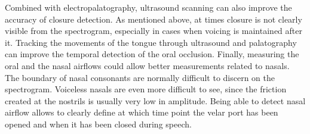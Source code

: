 \documentclass[11pt,a4paper,openany]{memoir}\usepackage[]{graphicx}\usepackage[]{color}
\begin{document}
Combined with electropalatography, ultrasound scanning can also improve the accuracy of closure detection.
As mentioned above, at times closure is not clearly visible from the spectrogram, especially in cases when voicing is maintained after it.
Tracking the movements of the tongue through ultrasound and palatography can improve the temporal detection of the oral occlusion.
Finally, measuring the oral and the nasal airflows could allow better measurements related to nasals.
The boundary of nasal consonants are normally difficult to discern on the spectrogram.
Voiceless nasals are even more difficult to see, since the friction created at the nostrils is usually very low in amplitude.
Being able to detect nasal airflow allows to clearly define at which time point the velar port has been opened and when it has been closed during speech.
















%





\appendix








\end{document}
